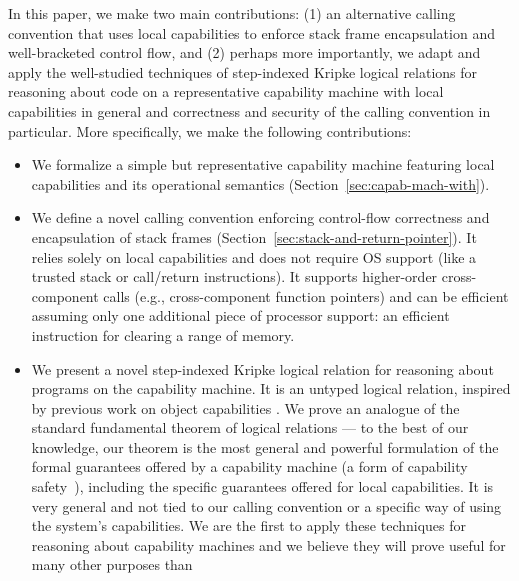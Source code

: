 \documentclass[format=acmsmall, review=true, screen=true]{acmart}
\renewcommand{\sectionname}{Section}
\newcommand\dominique[1]{{\color{purple} \sf \footnotesize {DD: #1}}\\}
\renewcommand\dominique[1]{}
\begin{document}
\dominique{I think we should include a comparison with the conference paper, and explain what the delta is for this journal version.}
In this paper, we make two main contributions: (1) an alternative calling
convention that uses local capabilities to enforce stack frame encapsulation and
well-bracketed control flow, and (2) perhaps more importantly, we adapt and
apply the well-studied techniques of step-indexed Kripke logical relations for
reasoning about code on a representative capability machine with local
capabilities in general and correctness and security of the calling convention
in particular. More specifically, we make the following contributions:
\begin{itemize}
\item We formalize a simple but representative capability machine featuring local
  capabilities and its operational semantics
  (\sectionname~\ref{sec:capab-mach-with}).
\item We define a novel calling convention enforcing control-flow correctness and
  encapsulation of stack frames (\sectionname~\ref{sec:stack-and-return-pointer}). It
  relies solely on local capabilities and does not require OS support (like a
  trusted stack or call/return instructions).
  It supports higher-order cross-component calls (e.g., cross-component function
  pointers) and can be efficient assuming only one additional piece of processor
  support: an efficient instruction for clearing a range of memory.
\item We present a novel step-indexed Kripke logical relation for reasoning
  about programs on the capability machine. It is an untyped logical relation,
  inspired by previous work on object capabilities \citep{Devriese:2016ObjCap}.
  We prove an analogue of the standard fundamental theorem of logical relations
  --- to the best of our knowledge, our theorem is %
  the most general and powerful formulation of the formal guarantees offered by
  a capability machine (a form of capability
  safety~\citep{Devriese:2016ObjCap,Maffeis2010OC}), including the specific
  guarantees offered for local capabilities. It is very general and not tied to
  our calling convention or a specific way of using the system's capabilities.
  We are the first to apply these techniques for reasoning about capability
  machines and we believe they will prove useful for many other purposes than

\end{itemize}
\end{document}
